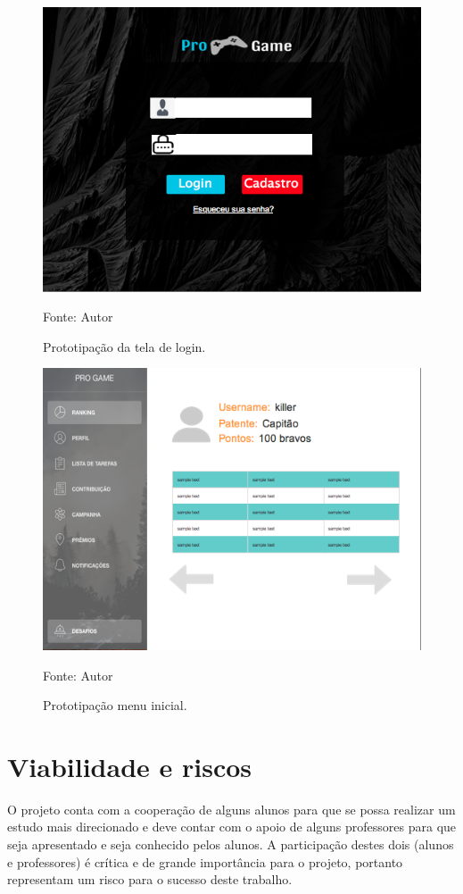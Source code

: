 \begin{figure}[h]
	\centering
	\includegraphics[keepaspectratio=true,scale=0.8]{figuras/login.png}
	\caption{Prototipação da tela de login.}
	Fonte: {Autor}
	\label{login}
\end{figure}	


\begin{figure}[h]
	\centering
	\includegraphics[keepaspectratio=true,scale=0.8]{figuras/perfil.png}
	\caption{Prototipação menu inicial.}
	Fonte: {Autor}
	\label{menuinicial}
\end{figure}	


\chapter{Viabilidade e riscos}
O projeto conta com a cooperação de alguns alunos para que se possa realizar um estudo mais direcionado e deve contar com o apoio de alguns professores
para que seja apresentado e seja conhecido pelos alunos. A participação destes dois (alunos e professores) é crítica  e de grande importância para o projeto,
portanto representam um risco para o sucesso deste trabalho.

